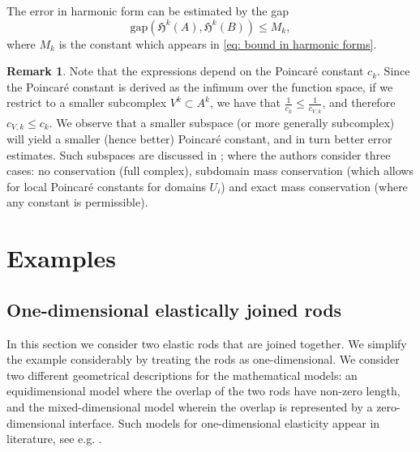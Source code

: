 \documentclass[reqno]{amsart}
\numberwithin{equation}{section}
\newtheorem{proposition}[theorem]{Proposition}
\theoremstyle{definition}
\newtheorem{remark}[theorem]{Remark}
\newcommand{\Cc}{\mathcal{C}}
\newcommand{\Ec}{\mathcal{E}}
\newcommand{\Hf}{\mathfrak{H}}
\newcommand{\Bf}{\mathfrak{B}}
\newcommand{\dom}{\mathrm{dom}}
\begin{document}
The error in harmonic form can be estimated by the gap
\begin{equation}
\mathrm{gap}(\Hf^k(A),\Hf^k(B)) \leq M_k,
\end{equation}
where $M_k$ is the constant which appears in \cref{eq: bound in harmonic forms}. 

\begin{remark}
Note that the expressions depend on the Poincaré constant $c_k$. Since the Poincaré constant is derived as the infimum over the function space, if we restrict to a smaller subcomplex $V^k \subset A^k$, we have that $\frac{1}{c_k} \leq \frac{1}{c_{V,k}}$, and therefore $c_{V,k} \leq c_k$. We observe that a smaller subspace (or more generally subcomplex) will yield a smaller (hence better) Poincaré constant, and in turn better error estimates. Such subspaces are discussed in \cite{varela2023posteriori}; where the authors consider three cases: no conservation (full complex), subdomain mass conservation (which allows for local Poincaré constants for domains $U_i$) and exact mass conservation (where any constant is permissible).
\end{remark}


%
%
%
%
%
%
%
%
%
%
%
%
%
%
%
%

\section{Examples}\label{sec:examples}
\subsection{One-dimensional elastically joined rods}
In this section we consider two elastic rods that are joined together. We simplify the example considerably by treating the rods as one-dimensional. We consider two different geometrical descriptions for the mathematical models: an equidimensional model where the overlap of the two rods have non-zero length, and the mixed-dimensional model wherein the overlap is represented by a zero-dimensional interface. Such models for one-dimensional elasticity appear in literature, see e.g. \cite{mejri2021carleman}.
\end{document}
